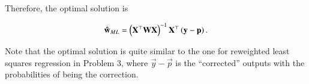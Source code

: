 \documentclass[journal,12pt,twocolumn]{IEEEtran}
\begin{document}
Therefore, the optimal solution is

\begin{equation}
     \boldsymbol{\mathbf{\hat{w}}}_{ML} = \left(\boldsymbol{\mathbf{X}}^\top\boldsymbol{\mathbf{WX}}\right)^{-1}\boldsymbol{\mathbf{X}}^\top\left(\boldsymbol{\mathbf{y}}-\boldsymbol{\mathbf{p}}\right).
     \label{eq:w-ml-log-reg}
\end{equation}

Note that the optimal solution is quite similar to the one for reweighted least
squares regression in Problem 3, where \(\vec{y}-\vec{p}\) is the ``corrected''
outputs with the probabilities of being the correction.
\end{document}

